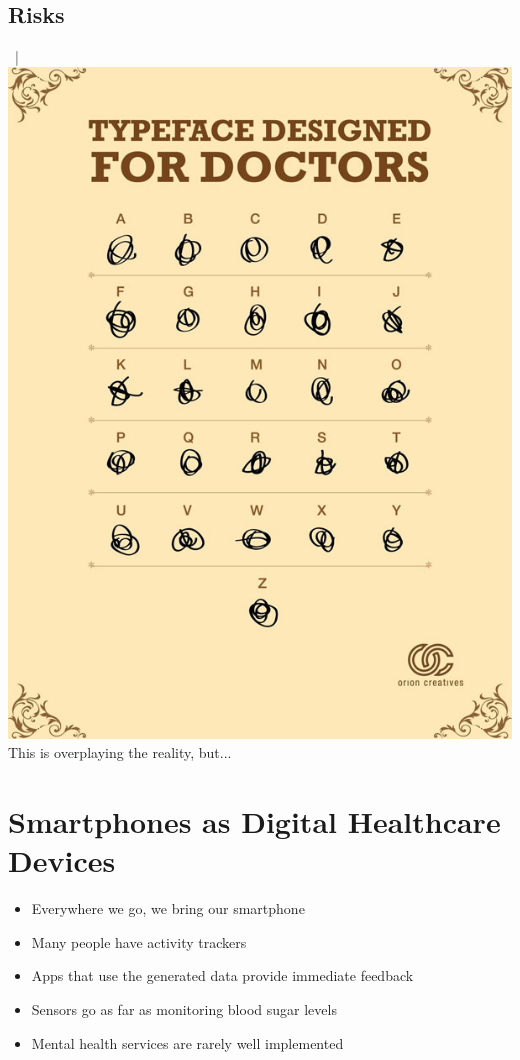 \documentclass[xcolor=dvipsnames, aspectratio=1610]{beamer}
\begin{document}
\subsection{Risks}%
\label{sub:risks}

\begin{frame}{\secname\ | \subsecname}
    \centering
    \includegraphics[height=0.8\textheight]{../media/doctor_handwriting.jpg} \\
    \small{This is overplaying the reality, but...}
\end{frame}

\section{Smartphones as Digital Healthcare Devices}%
\label{sec:smartphones_as_digital_healthcare_devices}

\begin{frame}{\secname}
    \begin{itemize}[<+->]
        \item Everywhere we go, we bring our smartphone
        \item Many people have activity trackers
        \item Apps that use the generated data provide immediate feedback
        \item Sensors go as far as monitoring blood sugar levels
        \item Mental health services are rarely well implemented
    \end{itemize}
\end{frame}
\end{document}
